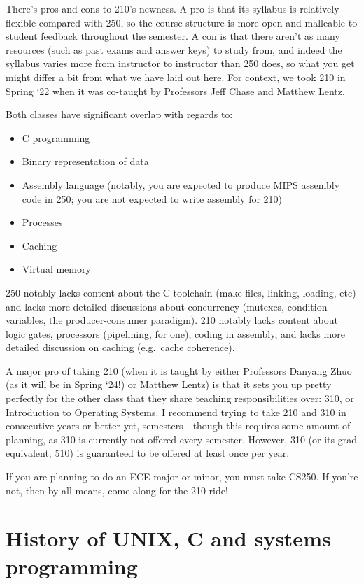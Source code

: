 \documentclass[fontsize=12pt,twoside=on,openright,parskip=half]{scrbook}
\begin{document}
There’s pros and cons to 210’s newness. A pro is that its syllabus is
relatively flexible compared with 250, so the course structure is more open and
malleable to student feedback throughout the semester. A con is that there
aren’t as many resources (such as past exams and answer keys) to study from,
and indeed the syllabus varies more from instructor to instructor than 250
does, so what you get might differ a bit from what we have laid out here. For
context, we took 210 in Spring ‘22 when it was co-taught by Professors Jeff
Chase and Matthew Lentz.

Both classes have significant overlap with regards to:

\begin{itemize}
	\item C programming
	\item Binary representation of data
	\item Assembly language (notably, you are expected to produce MIPS assembly
		code in 250; you are not expected to write assembly for 210)
	\item Processes
	\item Caching
	\item Virtual memory
\end{itemize}

250 notably lacks content about the C toolchain (make files, linking, loading,
etc) and lacks more detailed discussions about concurrency (mutexes, condition
variables, the producer-consumer paradigm). 210 notably lacks content about
logic gates, processors (pipelining, for one), coding in assembly, and lacks
more detailed discussion on caching (e.g.\ cache coherence).

A major pro of taking 210 (when it is taught by either Professors Danyang Zhuo
(as it will be in Spring ‘24!) or Matthew Lentz) is that it sets you up pretty
perfectly for the other class that they share teaching responsibilities over:
310, or Introduction to Operating Systems. I recommend trying to take 210 and
310 in consecutive years or better yet, semesters—though this requires some
amount of planning, as 310 is currently not offered every semester. However,
310 (or its grad equivalent, 510) is guaranteed to be offered at least once per
year.

If you are planning to do an ECE major or minor, you must take CS250. If you’re
not, then by all means, come along for the 210 ride! 

\section*{History of UNIX, C and systems programming}
\end{document}

